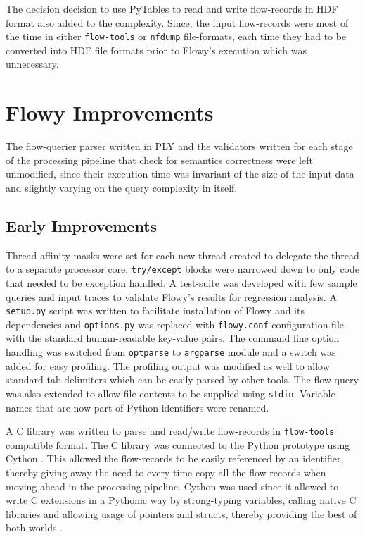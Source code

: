The decision decision to use PyTables to read and write flow-records in \ac{HDF} format also added to the complexity. Since, the input flow-records were most of the time  in either \texttt{flow-tools} or \texttt{nfdump} file-formats, each time they had to be converted into \ac{HDF} file formats prior to Flowy's execution which was unnecessary.

\section{Flowy Improvements}\label{sec:flowy-improvements}
The flow-querier parser written in \ac{PLY} and the validators written for each stage of the processing pipeline that check for semantics correctness were left unmodified, since their execution time was invariant of the size of the input data and slightly varying on the query complexity in itself.

\subsection{Early Improvements}\label{subsec:early-improvements}
Thread affinity masks were set for each new thread created to delegate the thread to a separate processor core. \texttt{try/except} blocks were narrowed down to only code that needed to be exception handled. A test-suite was developed with few sample queries and input traces to validate Flowy's results for regression analysis. A \texttt{setup.py} script was written to facilitate installation of  Flowy and its dependencies and \texttt{options.py} was replaced with \texttt{flowy.conf} configuration file with the standard human-readable key-value pairs. The command line option handling was switched from \texttt{optparse} to \texttt{argparse} module and a switch was added for easy profiling. The profiling output was modified as well to allow standard tab delimiters which can be easily parsed by other tools. The flow query was also  extended to allow file contents to be supplied using \texttt{stdin}. Variable names that are now part of Python identifiers were renamed. 

A C library was written to parse and read/write flow-records in \texttt{flow-tools} compatible format. The C library was connected to the Python prototype using Cython \cite{dseljebotn:2009}\cite{wilbers:2009}. This allowed the flow-records to be easily referenced by an  identifier, thereby giving away the need to every time copy all the flow-records when moving ahead in the processing pipeline. Cython was used since it allowed to write C extensions in a Pythonic way by strong-typing variables, calling native C libraries and allowing usage of pointers and structs, thereby providing the best of both worlds \cite{sbehnel:2011}. 

